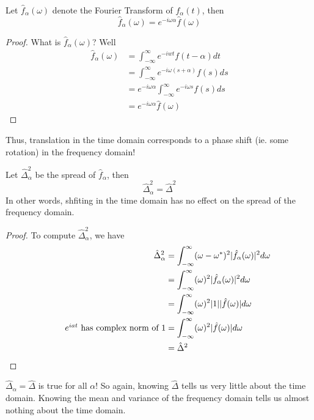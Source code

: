 \documentclass{article}
\begin{document}
\begin{proposition}
    Let $\hat{f}_\alpha(\omega)$ denote the Fourier Transform of $f_\alpha(t)$, then
    \[\hat{f}_\alpha(\omega) = e^{-i\omega \alpha} \hat{f}(\omega)\]
\end{proposition}

\begin{proof}
What is $\hat{f}_\alpha(\omega)$? Well
\begin{align*}
    \hat{f}_\alpha(\omega) &= \int_{-\infty}^\infty e^{-iwt} f(t - \alpha) dt\\
    &= \int_{-\infty}^\infty e^{-i\omega (s + \alpha)}f(s) ds \tag*{Let $s = t - \alpha$}\\
    &= e^{-i\omega \alpha} \int_{-\infty}^\infty e^{-i\omega s} f(s) ds\\
    &= e^{-i\omega \alpha} \hat{f}(\omega)
\end{align*}    
\end{proof}

Thus, translation in the time domain corresponds to a phase shift (ie. some rotation) in the frequency domain! 

\begin{proposition}
    Let $\hat{\Delta}^2_\alpha$ be the spread of $\hat{f}_\alpha$, then
    \[\hat{\Delta}^2_\alpha = \hat{\Delta}^2\]
    In other words, shfiting in the time domain has no effect on the spread of the frequency domain.
\end{proposition}

\begin{proof}
To compute $\hat{\Delta}^2_\alpha$, we have
\begin{align*}
    \hat{\Delta}^2_\alpha &= \int_{-\infty}^\infty (\omega - \omega^*)^2 |\hat{f}_\alpha(\omega)|^2 d\omega\\
    &= \int_{-\infty}^\infty (\omega)^2 |\hat{f}_\alpha(\omega)|^2 d\omega\\
    &= \int_{-\infty}^\infty (\omega)^2 |1| |\hat{f}(\omega)| d\omega\\ \tag*{$e^{iat}$ has complex norm of $1$}
    &= \int_{-\infty}^\infty (\omega)^2 |\hat{f}(\omega)| d\omega\\
    &= \hat{\Delta}^2
\end{align*}    
\end{proof}

$\hat{\Delta}_\alpha = \hat{\Delta}$ is true for all $\alpha$! So again, knowing $\hat{\Delta}$ tells us very little about the time domain. Knowing the mean and variance of the frequency domain tells us almost nothing about the time domain.
\end{document}
